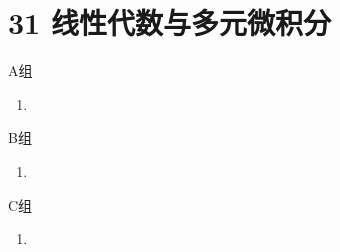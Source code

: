 \section*{31 线性代数与多元微积分}

\vspace{2ex}

\centerline{\heiti A组}
\begin{enumerate}
    \item
\end{enumerate}

\centerline{\heiti B组}
\begin{enumerate}
    \item
\end{enumerate}

\centerline{\heiti C组}
\begin{enumerate}
    \item
\end{enumerate}

\clearpage
